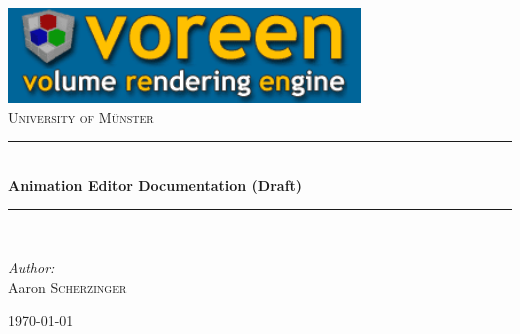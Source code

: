 \begin{titlepage}
\begin{center}

\includegraphics[width=0.7\textwidth]{images/voreen-banner.png}~\\[1cm]

\textsc{\LARGE University of M\"unster}\\[1.5cm]


\rule{\linewidth}{0.5mm} \\[0.4cm]
{ \huge \bfseries Animation Editor Documentation (Draft)\\[0.4cm] }

\rule{\linewidth}{0.5mm} \\[1.5cm]

\begin{minipage}{0.4\textwidth}
\begin{flushleft} \large
\emph{Author:}\\
Aaron \textsc{Scherzinger}
\end{flushleft}
\end{minipage}

\vfill

{\large \today}

\end{center}
\end{titlepage}
\newpage



